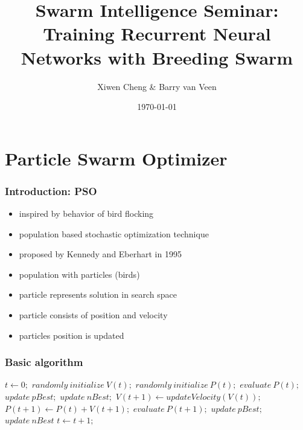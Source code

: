 \documentclass{beamer}
\title{Swarm Intelligence Seminar:\\Training Recurrent Neural Networks with Breeding Swarm}
\author{Xiwen Cheng \& Barry van Veen}
\institute{LIACS}
\date{\today}
\begin{document}
\begin{frame}
\titlepage
\end{frame}

\begin{frame}
\tableofcontents
\end{frame}

\section{Particle Swarm Optimizer}
\begin{frame}[fragile]
  \frametitle{Introduction: PSO}
  \begin{itemize}
    \item inspired by behavior of bird flocking
    \item population based stochastic optimization technique
    \item proposed by Kennedy and Eberhart in 1995 
  \end{itemize}
  
  \bigskip
  \begin{itemize}
    \item population with particles (birds)
    \item particle represents solution in search space
    \item particle consists of position and velocity
    \item particles position is updated
  \end{itemize}

\end{frame}

\begin{frame}[fragile]
  \frametitle{Basic algorithm}
  \begin{algorithmic}
    \STATE $t \gets 0;$
    \STATE $randomly\: initialize\: V(t);$
    \STATE $randomly\: initialize\: P(t);$
    \STATE $evaluate\: P(t);$
    \STATE $update\: pBest;$
    \STATE $update\: nBest;$
    \REPEAT
      \STATE $V(t+1) \gets updateVelocity(V(t));$
      \STATE $P(t+1) \gets P(t) + V(t+1);$
      \STATE $evaluate\: P(t+1);$
      \STATE $update\: pBest;$
      \STATE $update\: nBest$
      \STATE $t \gets t + 1;$
  \end{algorithmic}
\end{frame}
\end{document}
